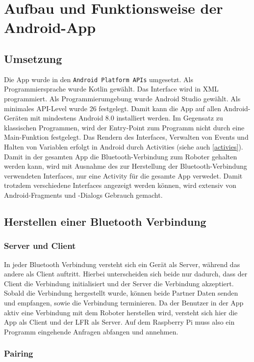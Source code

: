 \documentclass[12pt, a4paper]{report}
\begin{document}
\newpage
\section{Aufbau und Funktionsweise der Android-App}


\subsection{Umsetzung}

Die App wurde in den \texttt{Android Platform APIs} umgesetzt. Als Programmiersprache wurde Kotlin gewählt. Das Interface wird in XML programmiert. Als Programmierumgebung wurde Android Studio gewählt. Als minimales API-Level wurde 26 festgelegt. Damit kann die App auf allen Android-Geräten mit mindestens Android 8.0 installiert werden. Im Gegensatz zu klassischen Programmen, wird der Entry-Point zum Programm nicht durch eine Main-Funktion festgelegt. Das Rendern des Interfaces, Verwalten von Events und Halten von Variablen erfolgt in Android durch Activities (siehe auch \ref{activies}). Damit in der gesamten App die Bluetooth-Verbindung zum Roboter gehalten werden kann, wird mit Ausnahme des zur Herstellung der Bluetooth-Verbindung verwendeten Interfaces, nur eine Activity für die gesamte App verwedet. Damit trotzdem verschiedene Interfaces angezeigt werden können, wird extensiv von Android-Fragments und -Dialogs Gebrauch gemacht.


\subsection{Herstellen einer Bluetooth Verbindung}


\subsubsection{Server und Client}

In jeder Bluetooth Verbindung versteht sich ein Gerät als Server, während das andere als Client auftritt. Hierbei unterscheiden sich beide nur dadurch, dass der Client die Verbindung initialisiert und der Server die Verbindung akzeptiert. Sobald die Verbindung hergestellt wurde, können beide Partner Daten senden und empfangen, sowie die Verbindung terminieren. Da der Benutzer in der App aktiv eine Verbindung mit dem Roboter herstellen wird, versteht sich hier die App als Client und der LFR als Server. Auf dem Raspberry Pi muss also ein Programm eingehende Anfragen abfangen und annehmen.


\subsubsection{Pairing}
\end{document}
